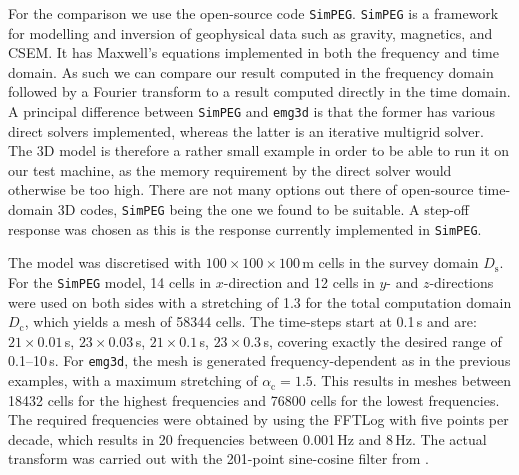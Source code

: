 \documentclass[
    manuscript,
    revised,
  ]{geophysics}
\newcommand{\mr}[1]{\mathrm{#1}}
\newcommand{\emg}[2]{\texttt{emg#1#2}\xspace}
\newcommand{\simpeg}{\texttt{SimPEG}\xspace}
\begin{document}
For the comparison we use the open-source code \simpeg \citep{CAG.15.Cockett}.
\simpeg is a framework for modelling and inversion of geophysical data such as
gravity, magnetics, and CSEM. It has Maxwell's equations implemented in both
the frequency and time domain. As such we can compare our result computed in
the frequency domain followed by a Fourier transform to a result computed
directly in the time domain. A principal difference between \simpeg and \emg3d
is that the former has various direct solvers implemented, whereas the latter
is an iterative multigrid solver. The 3D model is therefore a rather small
example in order to be able to run it on our test machine, as the memory
requirement by the direct solver would otherwise be too high. There are not
many options out there of open-source time-domain 3D codes, \simpeg being the
one we found to be suitable. A step-off response was chosen as this is the
response currently implemented in \simpeg.

The model was discretised with $100\times100\times100\,$m cells in the survey
domain $D_\mr{s}$. For the \simpeg model, 14 cells in $x$-direction and 12
cells in $y$- and $z$-directions were used on both sides with a stretching of
1.3 for the total computation domain $D_\mr{c}$, which yields a mesh of
\num{58344} cells. The time-steps start at 0.1\,s and are: $21\times0.01\,$s,
$23\times0.03\,$s, $21\times0.1\,$s, $23\times0.3\,$s, covering exactly the
desired range of 0.1--10\,s. For \emg3d, the mesh is generated
frequency-dependent as in the previous examples, with a maximum stretching of
$\alpha_\mr{c}=1.5$. This results in meshes between \num{18432} cells for the
highest frequencies and \num{76800} cells for the lowest frequencies. The
required frequencies were obtained by using the FFTLog with five points per
decade, which results in 20 frequencies between 0.001\,Hz and 8\,Hz. The actual
transform was carried out with the 201-point sine-cosine filter from
\cite{GEO.09.Key}.
\end{document}
